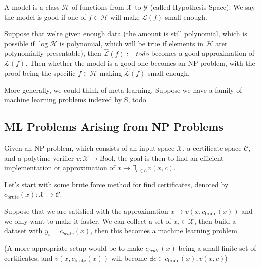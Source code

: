 \documentclass[11pt, oneside]{article}   	%
\theoremstyle{definition}
\begin{document}
A model is a class $\mathcal{H}$ of functions from $\mathcal{X}$ to $\mathcal{Y}$ (called Hypothesis Space). We say the model is good if one of $f\in \mathcal{H}$ will make $\mathscr{L}(f)$ small enough.

Suppose that we're given enough data (the amount is still polynomial, which is possible if $\log \mathcal{H}$ is polynomial, which will be true if elements in $\mathcal{H}$ arer polynomially presentable), then $\widehat{\mathscr{L}}(f):=todo$ becomes a good approximation of $\mathscr{L}(f)$. Then whether the model is a good one becomes an NP problem, with the proof being the specific $f\in \mathcal{H}$ making $\widehat{\mathscr{L}}(f)$ small enough.

More generally, we could think of meta learning. Suppose we have a family of machine learning problems indexed by S, todo
\subsection{ML Problems Arising from NP Problems}
\begin{center}
\end{center}

Given an NP problem, which consists of an input space $\mathcal{X}$, a certificate space $\mathcal{C}$, and a polytime verifier $v: \mathcal{X} \rightarrow \text{Bool}$, the goal is then to find an efficient implementation or approximation of $x\mapsto \exists_{c\in \mathcal{C}} v(x,c)$.

Let's start with some brute force method for find certificates, denoted by $c_{\text{brute}}(x): \mathcal{X} \to \mathcal{C}$.

Suppose that we are satisfied with the approximation $x\mapsto v(x,c_{\text{brute}}(x))$ and we only want to make it faster. We can collect a set of $x_i\in \mathcal{X}$, then build a dataset with $y_i=c_{brute}(x)$, then this becomes a machine learning problem.

(A more appropriate setup would be to make $c_{brute}(x)$ being a small finite set of certificates, and $v(x,c_{\text{brute}}(x))$ will become $\exists c\in c_{\text{brute}}(x), v(x, c)$)
\end{document}
